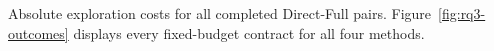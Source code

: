 \begin{table}[!htbp]
\caption{Absolute exploration costs for all \FixedDirectFullPairs{} completed Direct-Full pairs. Figure~\ref{fig:rq3-outcomes} displays every fixed-budget contract for all four methods.}
\label{tab:workload-main}
\centering

\end{table}
